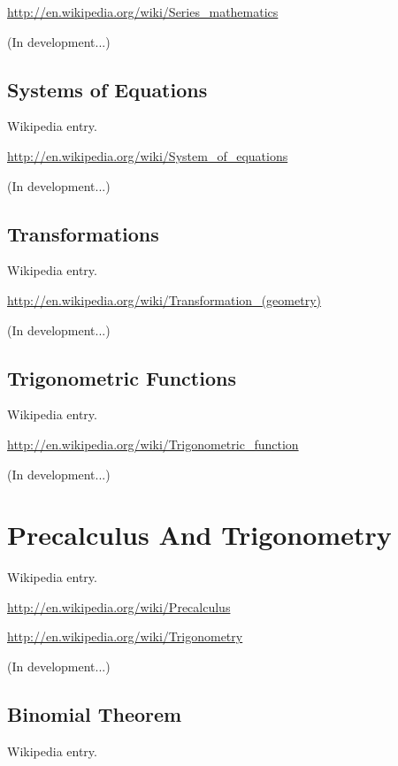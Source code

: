 \documentclass[12pt,twoside]{book}
\begin{document}
\href{http://en.wikipedia.org/wiki/Series_mathematics}{http://en.wikipedia.org/wiki/Series\_mathematics}

(In development...)

\subsection[Systems of Equations]{Systems of
Equations}
Wikipedia entry.

\href{http://en.wikipedia.org/wiki/System_of_equations}{http://en.wikipedia.org/wiki/System\_of\_equations}

(In development...)

\subsection[Transformations]{Transformations}
Wikipedia entry.

\href{http://en.wikipedia.org/wiki/Transformation_(geometry)}{http://en.wikipedia.org/wiki/Transformation\_(geometry)}

(In development...)

\subsection[Trigonometric Functions]{Trigonometric
Functions}
Wikipedia entry.

\href{http://en.wikipedia.org/wiki/Trigonometric_function}{http://en.wikipedia.org/wiki/Trigonometric\_function}

(In development...)

\section[Precalculus And Trigonometry]{Precalculus And
Trigonometry}
Wikipedia entry.

\href{http://en.wikipedia.org/wiki/Precalculus}{http://en.wikipedia.org/wiki/Precalculus}


\bigskip

\href{http://en.wikipedia.org/wiki/Trigonometry}{http://en.wikipedia.org/wiki/Trigonometry}

(In development...)

\subsection[Binomial Theorem]{Binomial Theorem}
Wikipedia entry.
\end{document}
